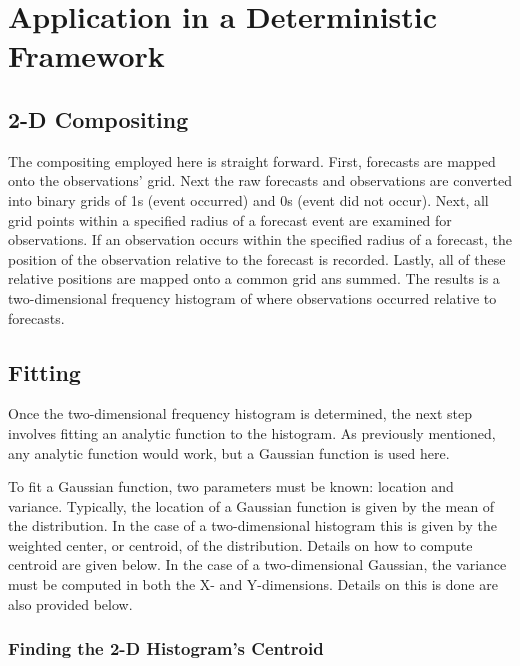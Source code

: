 \section{Application in a Deterministic Framework}
\label{dmethod}


\subsection{2-D Compositing}
\label{compositing}

The compositing employed here is straight forward. First, forecasts are mapped onto the observations' grid. Next the raw forecasts and observations are converted into binary grids of 1s (event occurred) and 0s (event did not occur). Next, all grid points within a specified radius of a forecast event are examined for observations. If an observation occurs within the specified radius of a forecast, the position of the observation relative to the forecast is recorded. Lastly, all of these relative positions are mapped onto a common grid ans summed. The results is a two-dimensional frequency histogram of where observations occurred relative to forecasts.




\subsection{Fitting}
\label{fitting}

Once the two-dimensional frequency histogram is determined, the next step involves fitting an analytic function to the histogram. As previously mentioned, any analytic function would work, but a Gaussian function is used here.

To fit a Gaussian function, two parameters must be known: location and variance. Typically, the location of a Gaussian function is given by the mean of the distribution. In the case of a two-dimensional histogram this is given by the weighted center, or centroid, of the distribution. Details on how to compute centroid are given below. In the case of a two-dimensional Gaussian, the variance must be computed in both the X- and Y-dimensions. Details on this is done are also provided below.




\subsubsection{Finding the 2-D Histogram's Centroid}
\label{centroid}

